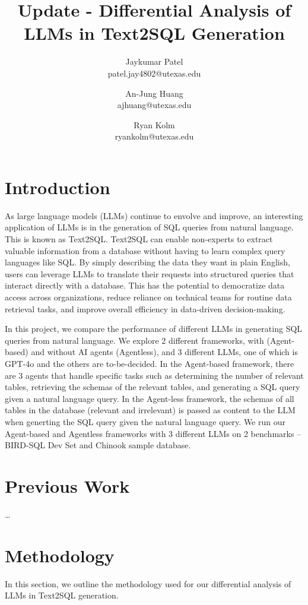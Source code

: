\documentclass[10pt,twocolumn]{article}
\title{Update - Differential Analysis of LLMs in Text2SQL Generation}
\author{Jaykumar Patel\\
patel.jay4802@utexas.edu\\
\and
An-Jung Huang\\
ajhuang@utexas.edu\\
\and
Ryan Kolm\\
ryankolm@utexas.edu\\
}
\begin{document}
\maketitle

\section{Introduction}

As large language models (LLMs) continue to envolve and improve, an interesting application of LLMs is in the generation of SQL queries from natural language. This is known as Text2SQL. Text2SQL can enable non-experts to extract valuable information from a database without having to learn complex query languages like SQL. By simply describing the data they want in plain English, users can leverage LLMs to translate their requests into structured queries that interact directly with a database. This has the potential to democratize data access across organizations, reduce reliance on technical teams for routine data retrieval tasks, and improve overall efficiency in data-driven decision-making.

In this project, we compare the performance of different LLMs in generating SQL queries from natural language. We explore 2 different frameworks, with (Agent-based) and without AI agents (Agentless), and 3 different LLMs, one of which is GPT-4o and the others are to-be-decided. In the Agent-based framework, there are 3 agents that handle specific tasks such as determining the number of relevant tables, retrieving the schemas of the relevant tables, and generating a SQL query given a natural language query. In the Agent-less framework, the schemas of all tables in the database (relevant and irrelevant) is passed as content to the LLM when generting the SQL query given the natural language query. We run our Agent-based and Agentless frameworks with 3 different LLMs on 2 benchmarks -- BIRD-SQL Dev Set and Chinook sample database.

\section{Previous Work}

\ldots

\section{Methodology}

In this section, we outline the methodology used for our differential analysis of LLMs in Text2SQL generation.
\end{document}
